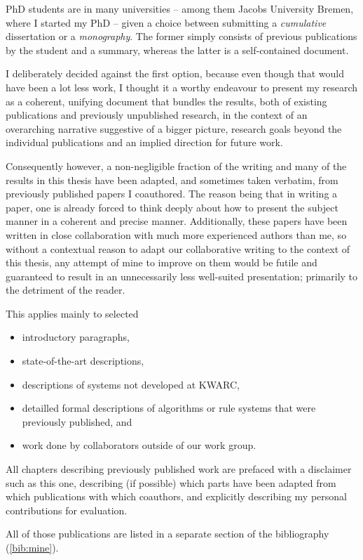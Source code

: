 \documentclass[a4paper,11pt]{book}
\begin{document}
\newpage
\thispagestyle{empty}
\begin{disclaimer*}
	PhD students are in many universities -- among them Jacobs University Bremen, where I started my PhD -- given a choice between submitting a \emph{cumulative} dissertation or a \emph{monography}.
	The former simply consists of previous publications by the student and a summary, whereas the latter is a self-contained document.
	
	I deliberately decided against the first option, because even though that would have been a lot less work, I thought it a worthy endeavour to present my research as a
	coherent, unifying document that bundles the results, both of existing publications and previously unpublished research, in the context of an overarching narrative
	suggestive of a bigger picture, research goals beyond the individual publications and an implied direction for future work.\medskip
	
	Consequently however, a non-negligible fraction of the writing and many of the results in this thesis have been adapted, and sometimes taken verbatim, from previously published papers I coauthored. The reason being that in writing a paper, one is already forced to think deeply about how to present the subject manner in a coherent and precise manner. Additionally, these papers have been written in close collaboration with much more experienced authors than me, so without a contextual reason to adapt our collaborative writing to the context of this thesis, any attempt of mine to improve on them would be futile and guaranteed to result in an unnecessarily less well-suited presentation; primarily to the detriment of the reader.
	
	This applies mainly to selected
	\begin{itemize}
		\item introductory paragraphs,
		\item state-of-the-art descriptions,
		\item descriptions of systems not developed at KWARC,
		\item detailled formal descriptions of algorithms or rule systems that were previously published, and
		\item work done by collaborators outside of our work group.
	\end{itemize}
	
	All chapters describing previously published work are prefaced with a disclaimer such as this one, describing (if possible) which parts have been adapted from which publications with which coauthors, and explicitly describing my personal contributions for evaluation.
	
	All of those publications are listed in a separate section of the bibliography (\autoref{bib:mine}).
\end{disclaimer*}
\end{document}
